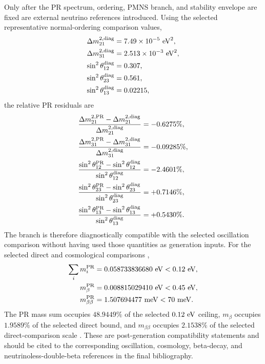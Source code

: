 \documentclass[11pt]{article}
\begin{document}
Only after the PR spectrum, ordering, PMNS branch, and stability envelope are fixed are external neutrino references introduced.  Using the selected representative normal-ordering comparison values,
\begin{align}
\Delta m_{21}^{2,{\rm diag}}
&=
7.49\times10^{-5}\ {\rm eV}^2,
\\
\Delta m_{31}^{2,{\rm diag}}
&=
2.513\times10^{-3}\ {\rm eV}^2,
\\
\sin^2\theta_{12}^{\rm diag}
&=
0.307,
\\
\sin^2\theta_{23}^{\rm diag}
&=
0.561,
\\
\sin^2\theta_{13}^{\rm diag}
&=
0.02215,
\end{align}
the relative PR residuals are
\begin{align}
\frac{\Delta m_{21}^{2,{\rm PR}}-\Delta m_{21}^{2,{\rm diag}}}
{\Delta m_{21}^{2,{\rm diag}}}
&=
-0.6275\%,
\\
\frac{\Delta m_{31}^{2,{\rm PR}}-\Delta m_{31}^{2,{\rm diag}}}
{\Delta m_{31}^{2,{\rm diag}}}
&=
-0.09285\%,
\\
\frac{\sin^2\theta_{12}^{\rm PR}-\sin^2\theta_{12}^{\rm diag}}
{\sin^2\theta_{12}^{\rm diag}}
&=
-2.4601\%,
\\
\frac{\sin^2\theta_{23}^{\rm PR}-\sin^2\theta_{23}^{\rm diag}}
{\sin^2\theta_{23}^{\rm diag}}
&=
+0.7146\%,
\\
\frac{\sin^2\theta_{13}^{\rm PR}-\sin^2\theta_{13}^{\rm diag}}
{\sin^2\theta_{13}^{\rm diag}}
&=
+0.5430\%.
\end{align}
The branch is therefore diagnostically compatible with the selected oscillation comparison without having used those quantities as generation inputs. For the selected direct and cosmological comparisons \cite{Planck2018Cosmology, KATRIN2022, KamLANDZen2023},
\begin{align}
\sum_i m_i^{\rm PR}
&=
0.058733836680\ {\rm eV}
<
0.12\ {\rm eV},
\\
m_\beta^{\rm PR}
&=
0.008815029410\ {\rm eV}
<
0.45\ {\rm eV},
\\
m_{\beta\beta}^{\rm PR}
&=
1.507694477\ {\rm meV}
<
70\ {\rm meV}.
\end{align}
The PR mass sum occupies \(48.9449\%\) of the selected \(0.12\ {\rm eV}\) ceiling, \(m_\beta\) occupies \(1.9589\%\) of the selected direct bound, and \(m_{\beta\beta}\) occupies \(2.1538\%\) of the selected direct-comparison scale \cite{PDG2024}.  These are post-generation compatibility statements and should be cited to the corresponding oscillation, cosmology, beta-decay, and neutrinoless-double-beta references in the final bibliography.
\end{document}
